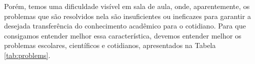 Porém, temos uma dificuldade visível em sala de aula, onde, aparentemente, os problemas que são resolvidos nela são insuficientes ou ineficazes para garantir a desejada transferência do conhecimento acadêmico para o cotidiano. Para que consigamos entender melhor essa característica, devemos entender melhor os problemas escolares, científicos e cotidianos, apresentados na Tabela \ref{tab:problems}. 
\begin{comment}
\begin{center}
\begin{table}[t!]
\captionof{table}{Tipos de Problema.}
\label{tab:problems}
\begin{tabular}{|l|l|l|}
\hline 
\multicolumn{1}{|p{68.505936pt}}{\centering {\bfseries Tipos de Problemas}} & \multicolumn{1}{|p{192.72pt}}{\centering {\bfseries Caracter\'{\i}sticas }} & \multicolumn{1}{|p{113.67469pt}|}{\centering {\bfseries Exemplo }}\\ 
\hline 
\multicolumn{1}{|p{68.505936pt}}{\raggedright {\bfseries Escolares }} & \multicolumn{1}{|p{192.72pt}}{\raggedright S\~ao, geralmente, apresentados nos livros-texto. De acordo com \citeonline{Pozo1998}, tanto o projeto quanto o planejamento dos problemas escolares devem se basear no fato de que o conhecimento dos alunos est\'a mais pr\'oximo do conhecimento cotidiano do que do cient\'{\i}fico. Al\'em disso, \'e necess\'ario que os problemas escolares ajudem o estudante durante esta etapa de aquisi\c{c}\~ao de conhecimento. } & \multicolumn{1}{|p{113.67469pt}|}{\raggedright Se deixarmos uma bola rolar sobre a superf\'{\i}cie de uma mesa, ao atingir a borda ela cair\'a, alcan\c{c}ando o ch\~ao a certa dist\^ancia da mesa. Determine a rela\c{c}\~ao que existe entre a altura da mesa e a dist\^ancia percorrida pela bola antes de chegar ao ch\~ao \cite{Pozo1998}). }\\ 
\hline 
\multicolumn{1}{|p{68.505936pt}}{\raggedright {\bfseries Cient\'{\i}ficos }} & \multicolumn{1}{|p{192.72pt}}{\raggedright S\~ao aqueles que servem para fazer novas descobertas, podendo ser tanto cient\'{\i}ficas quanto tecnol\'ogicas. Suas solu\c{c}\~oes geram novos conhecimentos acerca do universo, objetos e sistemas nele contidos.} & \multicolumn{1}{|p{113.67469pt}|}{\raggedright [], como controlar com precis\~ao o movimento de um el\'etron dentro de um tubo de raios cat\'odicos de uma televis\~ao \cite{Pozo1998}. }\\ 
\hline 
\multicolumn{1}{|p{68.505936pt}}{\raggedright {\bfseries Cotidianos }} & \multicolumn{1}{|p{192.72pt}}{\raggedright S\~ao instigados por curiosidades ou d\'uvidas sobre o funcionamento das coisas ou sistemas no cotidiano. Diferentes pessoas podem discordar sobre se um determinado fen\^omeno \'e ou n\~ao um problema, baseado nas suas experi\^encias pessoais. } & \multicolumn{1}{|p{113.67469pt}|}{\raggedright A bola de basquete acertar\'a a cesta? \\ 

\end{comment}
